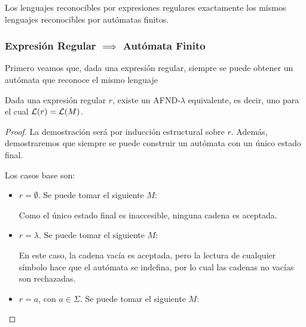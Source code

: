 Los lenguajes reconocibles por expresiones regulares exactamente los mismos lenguajes reconocibles por autómatas finitos.

\subsubsection{Expresión Regular $\implies$ Autómata Finito}

Primero veamos que, dada una expresión regular, siempre se puede obtener un autómata que reconoce el mismo lenguaje

\begin{theorem*}
    Dada una expresión regular $r$, existe un AFND-$\lambda$ equivalente, es decir, uno para el cual $\mathcal{L}(r) = \mathcal{L}(M)$.
\end{theorem*}
\begin{proof}
    La demostración será por inducción estructural sobre $r$. Además, demostraremos que siempre se puede construir un autómata con un único estado final.

    Los casos base son:
    \begin{itemize}
        \item $r = \emptyset$. Se puede tomar el siguiente $M$:
        \begin{figure}[H]
            \centering
        \end{figure}

        Como el único estado final es inaccesible, ninguna cadena es aceptada.
        \item $r = \lambda$. Se puede tomar el siguiente $M$:
        \begin{figure}[H]
            \centering
        \end{figure}

        En este caso, la cadena vacía es aceptada, pero la lectura de cualquier símbolo hace que el autómata se indefina, por lo cual las cadenas no vacías son rechazadas.
        \item $r = a$, con $a \in \Sigma$. Se puede tomar el siguiente $M$:
        \begin{figure}[H]
            \centering
\end{figure}
\end{itemize}
\end{proof}
